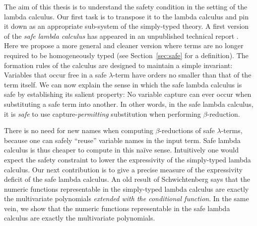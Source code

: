 The aim of this thesis is to understand the safety condition in the
setting of the lambda calculus. Our first task is to transpose it to
the lambda calculus and pin it down as an appropriate sub-system of
the simply-typed theory. A first version of the \emph{safe lambda
  calculus} has appeared in an unpublished technical report
\cite{safety-mirlong2004}. Here we propose a more general and
cleaner version where terms are no longer required to be
homogeneously typed (see Section~\ref{sec:safe} for a definition).
The formation rules of the calculus are designed to maintain a
simple invariant: Variables that occur free in a safe $\lambda$-term
have orders no smaller than that of the term itself.  We can now
explain the sense in which the safe lambda calculus is safe by
establishing its salient property: No variable capture can ever
occur when substituting a safe term into another. In other words, in
the safe lambda calculus, it is \emph{safe} to use
capture-\emph{permitting} substitution when performing
$\beta$-reduction.


There is no need for new names when computing $\beta$-reductions of
safe $\lambda$-terms, because one can safely ``reuse'' variable
names in the input term. Safe lambda calculus is thus cheaper to
compute in this na\"ive sense. Intuitively one would expect the
safety constraint to lower the expressivity of the simply-typed
lambda calculus. Our next contribution is to give a precise measure
of the expressivity deficit of the safe lambda calculus. An old
result of Schwichtenberg \cite{citeulike:622637} says that the
numeric functions representable in the simply-typed lambda calculus
are exactly the multivariate polynomials \emph{extended with the
conditional function}.  In the same vein, we show that the numeric
functions representable in the safe lambda calculus are exactly the
multivariate polynomials.

